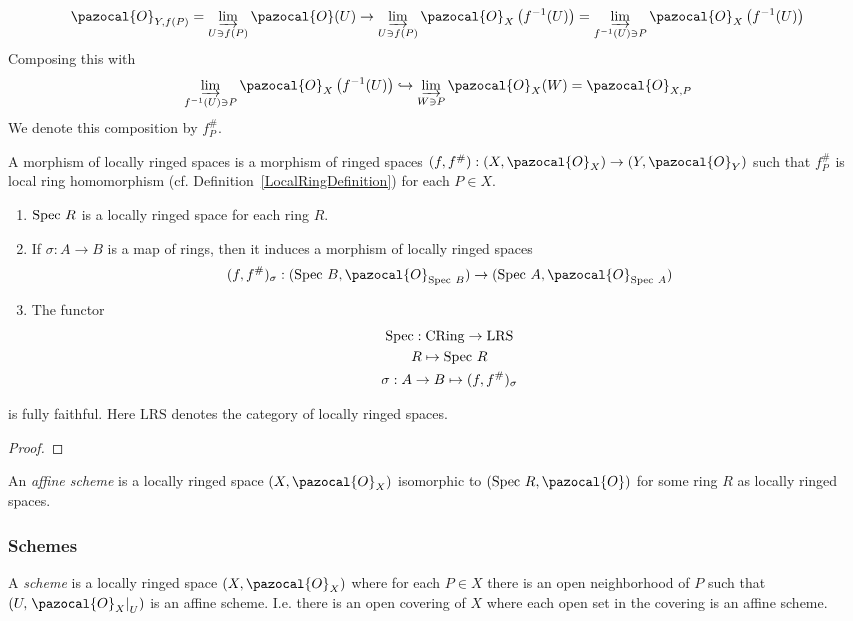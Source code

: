 $$
    \pazocal{O}_{Y,f(P)} = \varinjlim_{U\ni f(P)} \pazocal{O}(U)\rightarrow \varinjlim_{U\ni f(P)} \pazocal{O}_{X}\left(f^{-1}(U)\right) = \varinjlim_{f^{-1}(U)\ni P} \pazocal{O}_X\left(f^{-1}(U)\right)
$$
Composing this with 
$$
    \varinjlim_{f^{-1}(U)\ni P} \pazocal{O}_X\left(f^{-1}(U)\right)\hookrightarrow \varinjlim_{W\ni P} \pazocal{O}_X(W) = \pazocal{O}_{X,P}
$$
We denote this composition by $f^\#_P$.
\begin{definition}
    A morphism of locally ringed spaces is a morphism of ringed spaces $(f,f^\#):(X,\pazocal{O}_X)\rightarrow (Y,\pazocal{O}_Y)$ such that $f^\#_P$ is local ring homomorphism (cf. Definition~\ref{LocalRingDefinition}) for each $P\in X$. 
\end{definition}
\begin{lemma}
    \begin{enumerate}
        \item $\mathrm{Spec} \ R$ is a locally ringed space for each ring $R$.
        \item If $\sigma: A\rightarrow B$ is a map of rings, then it induces a morphism of locally ringed spaces
        \begin{gather*}
            (f,f^\#)_\sigma : (\Spec\ B, \pazocal{O}_{\Spec\ B}) \rightarrow (\Spec\ A, \pazocal{O}_{\Spec\ A})
        \end{gather*}
        \item The functor
        \begin{gather*}
            \mathrm{Spec} : \mathrm{CRing} \rightarrow \mathrm{LRS}\\
            R\mapsto \mathrm{Spec}\ R\\
            \sigma : A\rightarrow B \mapsto (f,f^\#)_\sigma
        \end{gather*}
    \end{enumerate}
    is fully faithful. Here $\mathrm{LRS}$ denotes the category of locally ringed spaces. 
\end{lemma}
\begin{proof}
    
\end{proof}
\begin{definition}
    An \emph{affine scheme} is a locally ringed space $(X,\pazocal{O}_X)$ isomorphic to $(\Spec \ R, \pazocal{O})$ for some ring $R$ as locally ringed spaces. 
\end{definition}
\subsubsection{Schemes}
\begin{definition}
    A \emph{scheme} is a locally ringed space $(X,\pazocal{O}_X)$ where for each $P\in X$ there is an open neighborhood of $P$ such that $(U,\left.\pazocal{O}_X\right|_U)$ is an affine scheme. I.e. there is an open covering of $X$ where each open set in the covering is an affine scheme. 
\end{definition}

